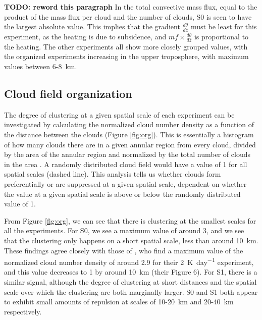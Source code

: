 \documentclass[11pt,a4paper]{article}
\newcommand\todo[1]{\textbf{TODO: #1}}
\begin{document}
\todo{reword this paragraph}
In the total convective mass flux, equal to the product of the mass flux per cloud and the number of clouds, S0 is seen to have the largest absolute value. This implies that the gradient $\frac{d \theta}{dz}$ must be least for this experiment, as the heating is due to subsidence, and $mf \times \frac{d \theta}{dz}$ is proportional to the heating. The other experiments all show more closely grouped values, with the organized experiments increasing in the upper troposphere, with maximum values between \SI{6}{}-\SI{8}{km}. 

\subsection{Cloud field organization}

The degree of clustering at a given spatial scale of each experiment can be investigated by calculating the normalized cloud number density as a function of the distance between the clouds (Figure \ref{fig:org}). This is essentially a histogram of how many clouds there are in a given annular region from every cloud, divided by the area of the annular region and normalized by the total number of clouds in the area \parencite{CC2006II}. A randomly distributed cloud field would have a value of 1 for all spatial scales (dashed line). This analysis tells us whether clouds form preferentially or are suppressed at a given spatial scale, dependent on whether the value at a given spatial scale is above or below the randomly distributed value of 1.

From Figure \ref{fig:org}, we can see that there is clustering at the smallest scales for all the experiments. For S0, we see a maximum value of around 3, and we see that the clustering only happens on a short spatial scale, less than around \SI{10}{km}. These findings agree closely with those of \cite{CC2006II}, who find a maximum value of the normalized cloud number density of around 2.9 for their \SI{2}{K.day^{-1}} experiment, and this value decreases to 1 by around \SI{10}{km} (their Figure 6). For S1, there is a similar signal, although the degree of clustering at short distances and the spatial scale over which the clustering are both marginally larger. S0 and S1 both appear to exhibit small amounts of repulsion at scales of \SI{10}{}-\SI{20}{km} and \SI{20}{}-\SI{40}{km} respectively.
\end{document}
